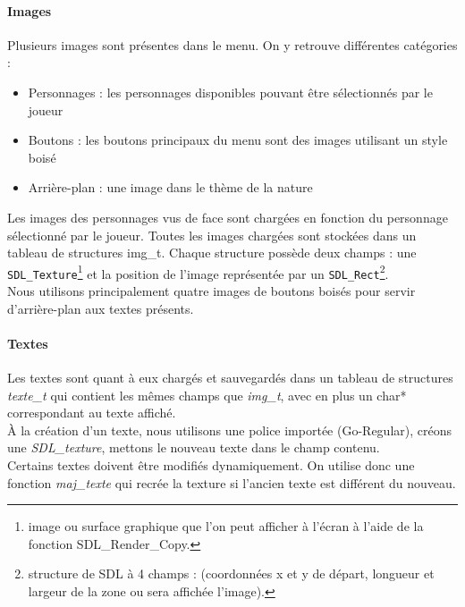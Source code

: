 \documentclass[11pt]{article}
\begin{document}
                \paragraph{Images}\leavevmode\newline
                Plusieurs images sont présentes dans le menu. On y retrouve différentes catégories : 
                \begin{itemize}
                    \item Personnages : les personnages disponibles pouvant être sélectionnés par le joueur
                    \item Boutons : les boutons principaux du menu sont des images utilisant un style boisé
                    \item Arrière-plan : une image dans le thème de la nature 
                \end{itemize}
                \leavevmode\newline
                Les images des personnages vus de face sont chargées en fonction du personnage sélectionné par le joueur. 
                Toutes les images chargées sont stockées dans un tableau de structures img\_t. Chaque structure possède deux champs : une \texttt{SDL\_Texture}\footnote{image ou surface graphique que l’on peut afficher à l’écran à l’aide de la fonction SDL\_Render\_Copy.} et la position de l’image représentée par un \texttt{SDL\_Rect}\footnote{structure de SDL à 4 champs : (coordonnées x et y de départ, longueur et largeur de la zone ou sera affichée l’image).}.\\
                Nous utilisons principalement quatre images de boutons boisés pour servir d’arrière-plan aux textes présents.

                \paragraph{Textes}\leavevmode\newline
                Les textes sont quant à eux chargés et sauvegardés dans un tableau de structures \textit{texte\_t} qui contient les mêmes champs que \textit{img\_t}, avec en plus un char* correspondant au texte affiché.\\
                À la création d’un texte, nous utilisons une police importée (Go-Regular), créons une \textit{SDL\_texture}, mettons le nouveau texte dans le  champ contenu.\\
                Certains textes doivent être modifiés dynamiquement. On utilise donc une fonction \textit{maj\_texte} qui recrée la texture si l’ancien texte est différent du nouveau.
                
\end{document}
